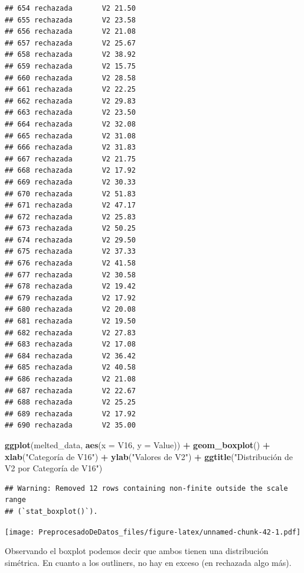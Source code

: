 \documentclass[
]{article}
\newenvironment{Shaded}{\begin{snugshade}}{\end{snugshade}}
\newcommand{\AttributeTok}[1]{\textcolor[rgb]{0.13,0.29,0.53}{#1}}
\newcommand{\FunctionTok}[1]{\textcolor[rgb]{0.13,0.29,0.53}{\textbf{#1}}}
\newcommand{\NormalTok}[1]{#1}
\newcommand{\SpecialCharTok}[1]{\textcolor[rgb]{0.81,0.36,0.00}{\textbf{#1}}}
\newcommand{\StringTok}[1]{\textcolor[rgb]{0.31,0.60,0.02}{#1}}
\begin{document}
\begin{verbatim}
## 654 rechazada       V2 21.50
## 655 rechazada       V2 23.58
## 656 rechazada       V2 21.08
## 657 rechazada       V2 25.67
## 658 rechazada       V2 38.92
## 659 rechazada       V2 15.75
## 660 rechazada       V2 28.58
## 661 rechazada       V2 22.25
## 662 rechazada       V2 29.83
## 663 rechazada       V2 23.50
## 664 rechazada       V2 32.08
## 665 rechazada       V2 31.08
## 666 rechazada       V2 31.83
## 667 rechazada       V2 21.75
## 668 rechazada       V2 17.92
## 669 rechazada       V2 30.33
## 670 rechazada       V2 51.83
## 671 rechazada       V2 47.17
## 672 rechazada       V2 25.83
## 673 rechazada       V2 50.25
## 674 rechazada       V2 29.50
## 675 rechazada       V2 37.33
## 676 rechazada       V2 41.58
## 677 rechazada       V2 30.58
## 678 rechazada       V2 19.42
## 679 rechazada       V2 17.92
## 680 rechazada       V2 20.08
## 681 rechazada       V2 19.50
## 682 rechazada       V2 27.83
## 683 rechazada       V2 17.08
## 684 rechazada       V2 36.42
## 685 rechazada       V2 40.58
## 686 rechazada       V2 21.08
## 687 rechazada       V2 22.67
## 688 rechazada       V2 25.25
## 689 rechazada       V2 17.92
## 690 rechazada       V2 35.00
\end{verbatim}

\begin{Shaded}
\begin{Highlighting}[]
\FunctionTok{ggplot}\NormalTok{(melted\_data, }\FunctionTok{aes}\NormalTok{(}\AttributeTok{x =}\NormalTok{ V16, }\AttributeTok{y =}\NormalTok{ Value)) }\SpecialCharTok{+}
  \FunctionTok{geom\_boxplot}\NormalTok{() }\SpecialCharTok{+}
  \FunctionTok{xlab}\NormalTok{(}\StringTok{"Categoría de V16"}\NormalTok{) }\SpecialCharTok{+}
  \FunctionTok{ylab}\NormalTok{(}\StringTok{"Valores de V2"}\NormalTok{) }\SpecialCharTok{+}
  \FunctionTok{ggtitle}\NormalTok{(}\StringTok{"Distribución de V2 por Categoría de V16"}\NormalTok{)}
\end{Highlighting}
\end{Shaded}

\begin{verbatim}
## Warning: Removed 12 rows containing non-finite outside the scale range
## (`stat_boxplot()`).
\end{verbatim}

\texttt{[image: PreprocesadoDeDatos\_files/figure-latex/unnamed-chunk-42-1.pdf]}

Observando el boxplot podemos decir que ambos tienen una distribución
simétrica. En cuanto a los outliners, no hay en exceso (en rechazada
algo más).
\end{document}

